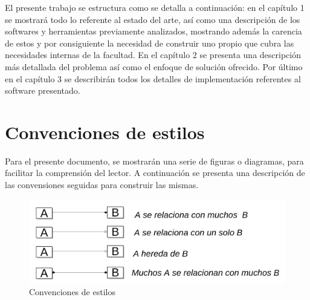 El presente trabajo se estructura como se detalla a continuación: en el capítulo 1 se mostrará todo lo referente al estado del arte, así como una descripción de los softwares y herramientas previamente analizados, mostrando además la carencia de estos y por consiguiente la necesidad de construir uno propio que cubra las necesidades internas de la facultad. En el capítulo 2 se presenta una descripción más detallada del problema así como el enfoque de solución ofrecido. Por último en el capítulo 3 se describirán todos los detalles de implementación referentes al software presentado.
	
\section{Convenciones de estilos}
	
Para el presente documento, se mostrarán una serie de figuras o diagramas, para facilitar la comprensión del lector. A continuación se presenta una descripción de las convensiones seguidas para construir las mismas.
	
\begin{figure}[h!]
	\centering
	\includegraphics[width=1\linewidth]{images/Introduction/style_conventions}
	\caption{Convenciones de estilos}
	\label{fig:style_conventions}
\end{figure}
	
	

